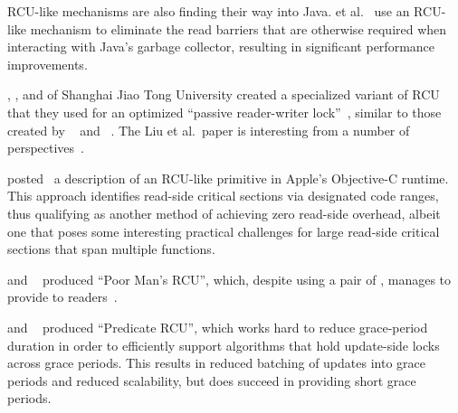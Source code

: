 RCU-like mechanisms are also finding their way into Java.
 et al.~\cite{Sivaramakrishnan:2012:ERB:2258996.2259005}
use an RCU-like mechanism to eliminate the read barriers that are
otherwise required when interacting with Java's garbage collector,
resulting in significant performance improvements.

, , and  of
Shanghai Jiao Tong University
created a specialized variant of RCU that they used for an optimized
``passive reader-writer lock''~\cite{RanLiu2014PassiveRWLock}, similar to
those created by ~\cite{GauthamShenoy2006RCUrwlock} and
~\cite{SrivatsaSBhat2014RCUrwlock}.
The Liu et al.\ paper is interesting from a number of
perspectives~\cite{PaulEMcKenney2014ReadMostly}.

 posted~\cite{MikeAsh2015Apple} a description of an RCU-like
primitive in Apple's Objective-C runtime.
This approach identifies read-side critical sections via designated
code ranges, thus qualifying as another method of achieving
zero read-side overhead, albeit one that poses some interesting
practical challenges for large read-side critical sections that
span multiple functions.

 and ~\cite{PedroRmalhete2015PoorMansRCU}
produced ``Poor Man's RCU'', which, despite using a pair of
, manages to provide 
 to
readers~\cite{PaulEMcKenney2015ReadMostly}.

 and ~\cite{Arbel:2015:PRR:2858788.2688518}
produced ``Predicate RCU'', which works hard to reduce grace-period
duration in order to efficiently support algorithms that hold
update-side locks across grace periods.
This results in reduced batching of updates into grace periods
and reduced scalability, but does succeed in providing short
grace periods.

\QuickQuizEnd


